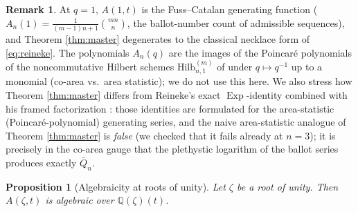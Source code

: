 \documentclass[11pt]{amsart}
\newtheorem{proposition}[theorem]{Proposition}
\theoremstyle{definition}
\newtheorem{remark}[theorem]{Remark}
\newcommand{\QQ}{\mathbb{Q}}
\newcommand{\Exp}{\operatorname{Exp}}
\begin{document}
\begin{remark}
At $q=1$, $A(1,t)$ is the Fuss--Catalan generating function ($A_n(1)=\frac{1}{(m-1)n+1}\binom{mn}{n}$, the ballot-number count of admissible sequences), and Theorem \ref{thm:master} degenerates to the classical necklace form of \eqref{eq:reineke}. The polynomials $A_n(q)$ are the images of the Poincar\'e polynomials of the noncommutative Hilbert schemes $\mathrm{Hilb}^{(m)}_{n,1}$ of \cite{Rei0306} under $q\mapsto q^{-1}$ up to a monomial (co-area vs.\ area statistic); we do not use this here. We also stress how Theorem \ref{thm:master} differs from Reineke's exact $\Exp$-identity \cite[Thm.~5.11]{Rei1102} combined with his framed factorization \cite[Cor.~2.2(4)]{Rei1102}: those identities are formulated for the area-statistic (Poincar\'e-polynomial) generating series, and the naive area-statistic analogue of Theorem \ref{thm:master} is \emph{false} (we checked that it fails already at $n=3$); it is precisely in the co-area gauge that the plethystic logarithm of the ballot series produces exactly $\bar Q_n$.
\end{remark}

\begin{proposition}[Algebraicity at roots of unity]\label{prop:algebraic}
Let $\zeta$ be a root of unity. Then $A(\zeta,t)$ is algebraic over $\QQ(\zeta)(t)$.
\end{proposition}
\end{document}
